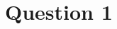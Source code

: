 \documentclass[letterpaper,12pt,oneside,final]{book}
\begin{document}



\newcommand\monPrenom{Nawras}		%
\newcommand\monNom{Mohammed Amin}			%
\newcommand\monMatricule{1962832}	%
\newcommand\monGroupe{Groupe 01}		%






\section*{Question 1}
\end{document}
